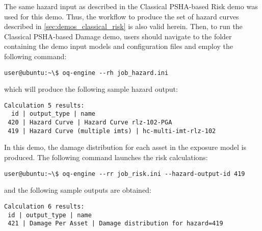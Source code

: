 The same hazard input as described in the Classical PSHA-based Risk demo was used for this demo. Thus, the workflow to produce the set of hazard curves described in \ref{sec:demos_classical_risk} is also valid herein. Then, to run the Classical PSHA-based Damage demo, users should navigate to the folder containing the demo input models and configuration files and employ the following command:

\begin{Verbatim}[frame=single, commandchars=\\\{\}, samepage=true]
user@ubuntu:~\$ oq-engine --rh job_hazard.ini
\end{Verbatim}

which will produce the following sample hazard output:

\begin{Verbatim}[frame=single, commandchars=\\\{\}, samepage=true]
Calculation 5 results:
  id | output_type | name
 420 | Hazard Curve | Hazard Curve rlz-102-PGA
 419 | Hazard Curve (multiple imts) | hc-multi-imt-rlz-102
\end{Verbatim}

In this demo, the damage distribution for each asset in the exposure model is produced. The following command launches the risk calculations:

\begin{Verbatim}[frame=single, commandchars=\\\{\}, samepage=true]
user@ubuntu:~\$ oq-engine --rr job_risk.ini --hazard-output-id 419
\end{Verbatim}

and the following sample outputs are obtained:

\begin{Verbatim}[frame=single, commandchars=\\\{\}, samepage=true]
Calculation 6 results:
 id | output_type | name
 421 | Damage Per Asset | Damage distribution for hazard=419
\end{Verbatim}